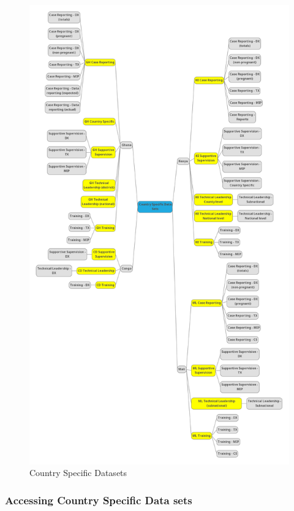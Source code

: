 \documentclass[]{book}
\begin{document}
\begin{figure}
\includegraphics[width=19.26in]{./images/pmp datasets} \caption{Country Specific Datasets}\label{fig:pmp-datasets}
\end{figure}

\hypertarget{accessing-country-specific-data-sets}{%
\subsubsection{Accessing Country Specific Data sets}\label{accessing-country-specific-data-sets}}
\end{document}
